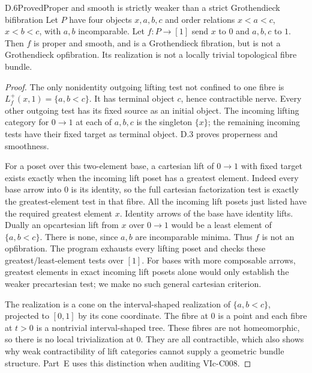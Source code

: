 \begin{statement}{D.6}{Proved}{Proper and smooth is strictly weaker than a strict Grothendieck bifibration}
Let $P$ have four objects $x,a,b,c$ and order relations $x<a<c$, $x<b<c$, with $a,b$ incomparable. Let $f:P\to[1]$ send $x$ to $0$ and $a,b,c$ to $1$. Then $f$ is proper and smooth, and is a Grothendieck fibration, but is not a Grothendieck opfibration. Its realization is not a locally trivial topological fibre bundle.
\end{statement}
\begin{proof}
The only nonidentity outgoing lifting test not confined to one fibre is $L_f^+(x,1)=\{a,b<c\}$. It has terminal object $c$, hence contractible nerve. Every other outgoing test has its fixed source as an initial object. The incoming lifting category for $0\to1$ at each of $a,b,c$ is the singleton $\{x\}$; the remaining incoming tests have their fixed target as terminal object. D.3 proves properness and smoothness.

For a poset over this two-element base, a cartesian lift of $0\to1$ with fixed target exists exactly when the incoming lift poset has a greatest element. Indeed every base arrow into $0$ is its identity, so the full cartesian factorization test is exactly the greatest-element test in that fibre. All the incoming lift posets just listed have the required greatest element $x$. Identity arrows of the base have identity lifts. Dually an opcartesian lift from $x$ over $0\to1$ would be a least element of $\{a,b<c\}$. There is none, since $a,b$ are incomparable minima. Thus $f$ is not an opfibration. The program exhausts every lifting poset and checks these greatest/least-element tests over $[1]$. For bases with more composable arrows, greatest elements in exact incoming lift posets alone would only establish the weaker precartesian test; we make no such general cartesian criterion.

The realization is a cone on the interval-shaped realization of $\{a,b<c\}$, projected to $[0,1]$ by its cone coordinate. The fibre at $0$ is a point and each fibre at $t>0$ is a nontrivial interval-shaped tree. These fibres are not homeomorphic, so there is no local trivialization at $0$. They are all contractible, which also shows why weak contractibility of lift categories cannot supply a geometric bundle structure. Part~E uses this distinction when auditing VIc-C008.
\end{proof}

